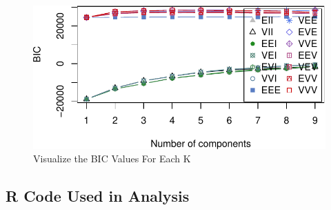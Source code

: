 \documentclass[
  letterpaper,
  DIV=11,
  numbers=noendperiod]{scrartcl}
\begin{document}
\begin{figure}

{\centering \includegraphics{437_final_project_files/figure-pdf/fig-BIC-1.pdf}

}

\caption{\label{fig-BIC}Visualize the BIC Values For Each K}

\end{figure}

\hypertarget{r-code-used-in-analysis}{%
\subsection{R Code Used in Analysis}\label{r-code-used-in-analysis}}
\end{document}
